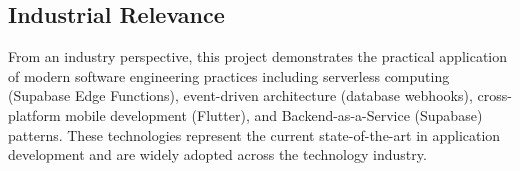 \subsection{Industrial Relevance}

From an industry perspective, this project demonstrates the practical application of modern software engineering practices including serverless computing (Supabase Edge Functions), event-driven architecture (database webhooks), cross-platform mobile development (Flutter), and Backend-as-a-Service (Supabase) patterns. These technologies represent the current state-of-the-art in application development and are widely adopted across the technology industry.
